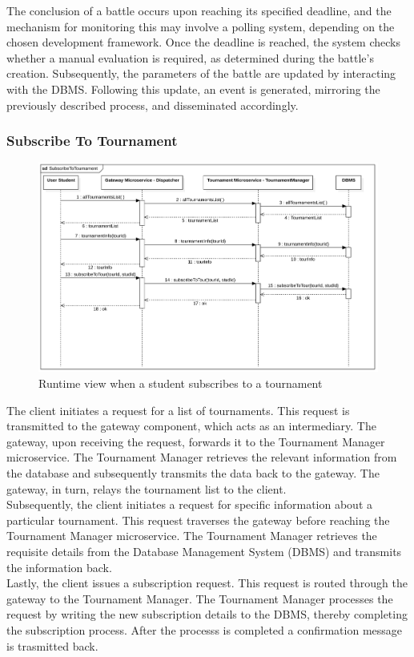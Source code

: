 The conclusion of a battle occurs upon reaching its specified deadline, and the mechanism for monitoring this may involve a polling system, depending on the chosen development framework. Once the deadline is reached, the system checks whether a manual evaluation is required, as determined during the battle's creation. Subsequently, the parameters of the battle are updated by interacting with the DBMS. Following this update, an event is generated, mirroring the previously described process, and disseminated accordingly.

\newpage

\subsubsection*{Subscribe To Tournament}
\begin{figure}[h!]
    \centering
    \includegraphics[width=1\linewidth]{2.ArchitecturalDesign/res/subscribeToTournament.png}
    \caption{Runtime view when a student subscribes to a tournament}
    \label{fig:subsTournament}
\end{figure}

The client initiates a request for a list of tournaments. This request is transmitted to the gateway component, which acts as an intermediary.
The gateway, upon receiving the request, forwards it to the Tournament Manager microservice. The Tournament Manager retrieves the relevant information from the database and subsequently transmits the data back to the gateway.
The gateway, in turn, relays the tournament list to the client.\\
Subsequently, the client initiates a request for specific information about a particular tournament. This request traverses the gateway before reaching the Tournament Manager microservice. The Tournament Manager retrieves the requisite details from the Database Management System (DBMS) and transmits the information back.\\
Lastly, the client issues a subscription request. This request is routed through the gateway to the Tournament Manager. The Tournament Manager processes the request by writing the new subscription details to the DBMS, thereby completing the subscription process. After the processs is completed a confirmation message is trasmitted back.

